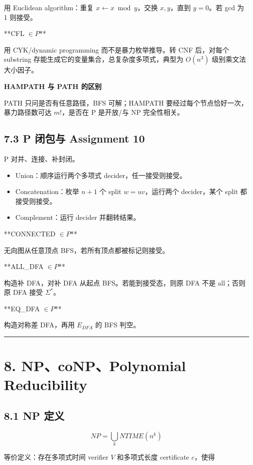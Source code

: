 ﻿\documentclass[UTF8,11pt]{ctexart}
\begin{document}
用 Euclidean algorithm：重复 \(x\leftarrow x\bmod y\)，交换 \(x,y\)，直到 \(y=0\)。若 gcd 为 1 则接受。


**CFL \(\in P\)**  

用 CYK/dynamic programming 而不是暴力枚举推导。转 CNF 后，对每个 substring 存能生成它的变量集合，总复杂度多项式，典型为 \(O(n^3)\) 级别乘文法大小因子。


\textbf{HAMPATH 与 PATH 的区别}  

PATH 只问是否有任意路径，BFS 可解；HAMPATH 要经过每个节点恰好一次，暴力路径数可达 \(m!\)，是否在 P 是开放/与 NP 完全性相关。


\subsection{7.3 P 闭包与 Assignment 10}


P 对并、连接、补封闭。


\begin{itemize}
\item Union：顺序运行两个多项式 decider，任一接受则接受。
\item Concatenation：枚举 \(n+1\) 个 split \(w=uv\)，运行两个 decider，某个 split 都接受则接受。
\item Complement：运行 decider 并翻转结果。
\end{itemize}


**CONNECTED \(\in P\)**  

无向图从任意顶点 BFS，若所有顶点都被标记则接受。


**ALL\_DFA \(\in P\)**  

构造补 DFA，对补 DFA 从起点 BFS。若能到接受态，则原 DFA 不是 all；否则原 DFA 接受 \(\Sigma^*\)。


**EQ\_DFA \(\in P\)**  

构造对称差 DFA，再用 \(E_{DFA}\) 的 BFS 判空。


\bigskip\hrule\bigskip


\section{8. NP、coNP、Polynomial Reducibility}


\subsection{8.1 NP 定义}


\[
NP=\bigcup_k NTIME(n^k)
\]

等价定义：存在多项式时间 verifier \(V\) 和多项式长度 certificate \(c\)，使得
\end{document}
